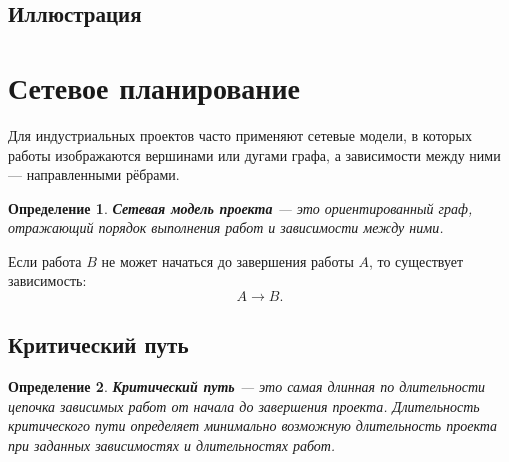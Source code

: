 \documentclass[12pt,a4paper]{article}
\newtheorem{definition}{Определение}
\begin{document}
\subsection{Иллюстрация}

\begin{center}
\end{center}

\section{Сетевое планирование}

Для индустриальных проектов часто применяют сетевые модели, в которых работы изображаются вершинами или дугами графа, а зависимости между ними --- направленными рёбрами.

\begin{definition}
\textbf{Сетевая модель проекта} --- это ориентированный граф, отражающий порядок выполнения работ и зависимости между ними.
\end{definition}

Если работа $B$ не может начаться до завершения работы $A$, то существует зависимость:
\[
A \rightarrow B.
\]

\subsection{Критический путь}

\begin{definition}
\textbf{Критический путь} --- это самая длинная по длительности цепочка зависимых работ от начала до завершения проекта. Длительность критического пути определяет минимально возможную длительность проекта при заданных зависимостях и длительностях работ.
\end{definition}
\end{document}
